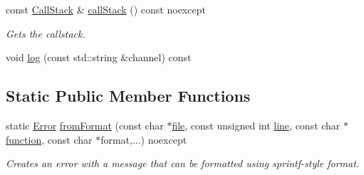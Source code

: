 \begin{DoxyCompactItemize}
const \hyperlink{group___utility_module_gabdf2d70ae3aab3c57142eddec69a725c}{Call\+Stack} \& \hyperlink{classdg_1_1deepcore_1_1_error_af326513a1dad0dde7d595c2b9f9d9d1e}{call\+Stack} () const noexcept
\begin{DoxyCompactList}\small\item\em Gets the callstack. \end{DoxyCompactList}\item 
void \hyperlink{classdg_1_1deepcore_1_1_error_a2b4a03a6ce3cc8b5ab2fdc719e270e61}{log} (const std\+::string \&channel) const 
\end{DoxyCompactItemize}
\subsection*{Static Public Member Functions}
\begin{DoxyCompactItemize}
\item 
static \hyperlink{classdg_1_1deepcore_1_1_error}{Error} \hyperlink{group___utility_module_ga00500e337578c7170d2608cb93af4f51}{from\+Format} (const char $\ast$\hyperlink{group___utility_module_ga0b75e32780cb8534179ff3c060739496}{file}, const unsigned int \hyperlink{group___utility_module_ga13437b5caffe754b7a32fc3c514907e5}{line}, const char $\ast$\hyperlink{group___utility_module_gaa69c98222c56544a9094154a8eab4db9}{function}, const char $\ast$format,...) noexcept
\begin{DoxyCompactList}\small\item\em Creates an error with a message that can be formatted using sprintf-\/style format. \end{DoxyCompactList}\end{DoxyCompactItemize}
